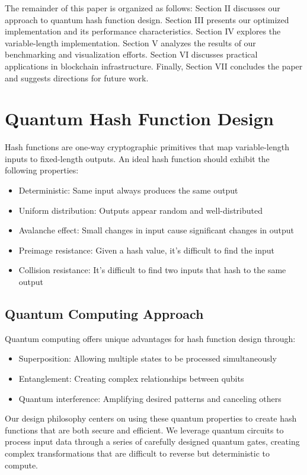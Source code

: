\documentclass[conference]{IEEEtran}
\begin{document}
The remainder of this paper is organized as follows: Section II discusses our approach to quantum hash function design. Section III presents our optimized implementation and its performance characteristics. Section IV explores the variable-length implementation. Section V analyzes the results of our benchmarking and visualization efforts. Section VI discusses practical applications in blockchain infrastructure. Finally, Section VII concludes the paper and suggests directions for future work.

\newpage
\twocolumn

\section{Quantum Hash Function Design}
Hash functions are one-way cryptographic primitives that map variable-length inputs to fixed-length outputs. An ideal hash function should exhibit the following properties:
\begin{itemize}
    \item Deterministic: Same input always produces the same output
    \item Uniform distribution: Outputs appear random and well-distributed
    \item Avalanche effect: Small changes in input cause significant changes in output
    \item Preimage resistance: Given a hash value, it's difficult to find the input
    \item Collision resistance: It's difficult to find two inputs that hash to the same output
\end{itemize}

\subsection{Quantum Computing Approach}
Quantum computing offers unique advantages for hash function design through:

\begin{itemize}
    \item Superposition: Allowing multiple states to be processed simultaneously
    \item Entanglement: Creating complex relationships between qubits
    \item Quantum interference: Amplifying desired patterns and canceling others
\end{itemize}

Our design philosophy centers on using these quantum properties to create hash functions that are both secure and efficient. We leverage quantum circuits to process input data through a series of carefully designed quantum gates, creating complex transformations that are difficult to reverse but deterministic to compute.
\end{document}
